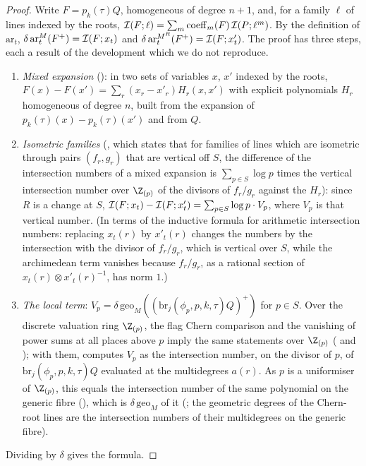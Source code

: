 \begin{proof}
Write $F=p_k(\tau)Q$, homogeneous of degree $n+1$, and, for a family $\ell$ of lines indexed by the roots,
$\mathcal{I}(F;\ell)=\sum_m\mathrm{coeff}_m(F)\,\mathcal{I}(P;\ell^m)$. By the definition of $\mathrm{ar}_t$,
$\delta\,\mathrm{ar}^M_t(F^+)=\mathcal{I}(F;x_t)$ and $\delta\,\mathrm{ar}^{M^R}_t(F^+)=\mathcal{I}(F;x'_t)$. The proof
has three steps, each a result of the development which we do not reproduce.
\begin{enumerate}[label=(\arabic*)]
\item \emph{Mixed expansion}
(): in two sets of variables $x$, $x'$ indexed by the roots,
$F(x)-F(x')=\sum_r(x_r-x'_r)H_r(x,x')$ with explicit polynomials $H_r$ homogeneous of degree $n$, built from the
expansion of $p_k(\tau)(x)-p_k(\tau)(x')$ and from $Q$.
\item \emph{Isometric families}
(, which states that for families of lines which are
isometric through pairs $(f_r,g_r)$ that are vertical off $S$, the difference of the intersection numbers of a mixed
expansion is $\sum_{p\in S}\log p$ times the vertical intersection number over $\Z_{(p)}$ of the divisors of
$f_r/g_r$ against the $H_r$): since $R$ is a change at $S$, $\mathcal{I}(F;x_t)-\mathcal{I}(F;x'_t)=\sum_{p\in S}\log p\cdot
V_p$, where $V_p$ is that vertical number. (In terms of the inductive formula for arithmetic intersection numbers:
replacing $x_t(r)$ by $x'_t(r)$ changes the numbers by the intersection with the divisor of $f_r/g_r$, which is
vertical over $S$, while the archimedean term vanishes because $f_r/g_r$, as a rational section of
$x_t(r)\otimes x'_t(r)^{-1}$, has norm $1$.)
\item \emph{The local term}: $V_p=\delta\,\mathrm{geo}_M((\mathrm{br}_j(\phi_p,p,k,\tau)Q)^+)$ for $p\in S$. Over the
discrete valuation ring $\Z_{(p)}$, the flag Chern comparison and the vanishing of power sums at all places above $p$
imply the same statements over $\Z_{(p)}$ ( and
); with them,
 computes $V_p$ as the intersection number, on the
divisor of $p$, of $\mathrm{br}_j(\phi_p,p,k,\tau)Q$ evaluated at the multidegrees $a(r)$. As $p$ is a uniformiser of
$\Z_{(p)}$, this equals the intersection number of the same polynomial on the generic fibre
(), which is $\delta\,\mathrm{geo}_M$ of it
(; the geometric degrees of the Chern-root lines are
the intersection numbers of their multidegrees on the generic fibre).
\end{enumerate}
Dividing by $\delta$ gives the formula.
\end{proof}

